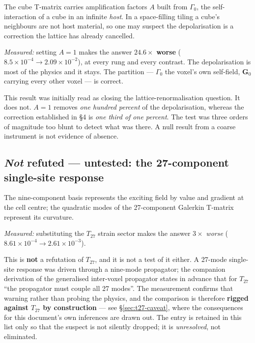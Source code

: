 \documentclass[11pt,a4paper]{article}
\begin{document}
The cube T-matrix carries amplification factors $A$ built from $\Gamma_0$, the
self-interaction of a cube in an infinite \emph{host}. In a space-filling tiling
a cube's neighbours are not host material, so one may suspect the depolarisation
is a correction the lattice has already cancelled.

\emph{Measured:} setting $A=1$ makes the answer $\mathbf{24.6\times}$
\textbf{worse} ($8.5\times10^{-4}\to2.09\times10^{-2}$), at every rung and every
contrast. The depolarisation is most of the physics and it stays. The partition
--- $\Gamma_0$ the voxel's own self-field, $\bm{G}_0$ carrying every other voxel
--- is correct.

\begin{tcolorbox}[colback=red!4,colframe=red!45!black,title=A refutation that was later shown to be too coarse]
This result was initially read as closing the lattice-renormalisation question.
It does not. $A=1$ removes \emph{one hundred percent} of the depolarisation,
whereas the correction established in \S4 is \emph{one third of one percent}. The
test was three orders of magnitude too blunt to detect what was there. A null
result from a coarse instrument is not evidence of absence.
\end{tcolorbox}

\subsection{\emph{Not} refuted --- untested: the 27-component single-site response}

The nine-component basis represents the exciting field by value and gradient at
the cell centre; the quadratic modes of the 27-component Galerkin T-matrix
represent its curvature.

\emph{Measured:} substituting the $T_{27}$ strain sector makes the answer
$3\times$ \emph{worse} ($8.61\times10^{-4}\to2.61\times10^{-3}$).

This is \textbf{not} a refutation of $T_{27}$, and it is not a test of it either.
A 27-mode single-site response was driven through a nine-mode propagator; the
companion derivation of the generalised inter-voxel propagator states in advance
that for $T_{27}$ ``the propagator must couple all 27 modes''. The measurement
confirms that warning rather than probing the physics, and the comparison is
therefore \textbf{rigged against $T_{27}$ by construction} --- see
\S\ref{sec:t27-caveat}, where the consequences for this document's own inferences
are drawn out. The entry is retained in this list only so that the suspect is not
silently dropped; it is \emph{unresolved}, not eliminated.
\end{document}
